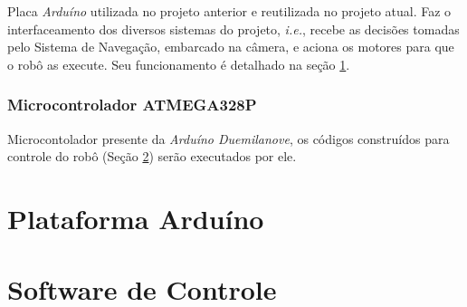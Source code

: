 Placa \textit{Arduíno} utilizada no projeto anterior e reutilizada no projeto atual. Faz o interfaceamento dos diversos sistemas do projeto, \textit{i.e.}, recebe as decisões tomadas pelo Sistema de Navegação, embarcado na câmera, e aciona os motores para que o robô as execute. Seu funcionamento é detalhado na seção \ref{sec_arduino}.

\subsubsection{Microcontrolador ATMEGA328P}

Microcontolador presente da \textit{Arduíno Duemilanove}, os códigos construídos para controle do robô (Seção \ref{sec_soft_controle}) serão executados por ele.

\section{Plataforma Arduíno}
\label{sec_arduino}


\section{Software de Controle}
\label{sec_soft_controle}
